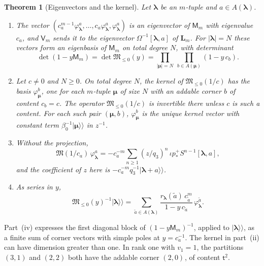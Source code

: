 \documentclass[11pt]{amsart}
\newtheorem{theorem}{Theorem}[section]
\theoremstyle{definition}
\theoremstyle{remark}
\newcommand{\Mt}{\mathsf t}                      %
\newcommand{\betaz}{\beta_0}                     %
\newcommand{\bl}{{\boldsymbol{\lambda}}}         %
\newcommand{\bmu}{{\boldsymbol{\mu}}}
\newcommand{\Add}[1]{A(#1)}                      %
\newcommand{\res}[2]{r_{#1}(#2)}                 %
\newcommand{\ceig}[1]{c_{#1}}                    %
\newcommand{\bx}[3]{(#1,#2)_{#3}}                %
\newcommand{\kket}[1]{\lvert #1\rangle\!\rangle} %
\newcommand{\pt}[2]{[#1,#2]}                     %
\newcommand{\pushp}{p^+_*}                       %
\newcommand{\Shift}{S}                           %
\newcommand{\Omap}{\Omega}                       %
\newcommand{\Hiso}{\iota}                        %
\newcommand{\LL}{\mathbf L}
\newcommand{\Lax}[1]{\LL_{#1}}                   %
\newcommand{\MM}{\mathsf M}
\newcommand{\Miura}[1]{\MM_{#1}}                 %
\newcommand{\VV}{\mathsf V}
\newcommand{\Vconj}[1]{\VV_{#1}}                 %
\newcommand{\Miuraop}{\mathfrak M}               %
\newcommand{\Miuraproj}{\Miuraop_{\leq0}}         %
\newcommand{\Meig}[2]{\varphi_{#1}^{#2}}         %
\begin{document}
\begin{theorem}[Eigenvectors and the kernel]\label{thm:kernel}
Let \(\bl\) be an \(m\)-tuple and \(a\in\Add{\bl}\).
\begin{enumerate}
\item[(i)] The vector \((\ceig{a}^{m-1}\Meig{\bl}{a},\dots,\ceig{a}\Meig{\bl}{a},\Meig{\bl}{a})\) is an eigenvector
of \(\Miura{m}\) with eigenvalue \(\ceig{a}\), and \(\Vconj{m}\) sends it to the eigenvector
\(\Omap^{-1}\pt{\bl}{a}\) of \(\Lax{m}\). For \(|\bl|=N\) these vectors form an eigenbasis of \(\Miura{m}\) on total
degree \(N\), with determinant
\[
 \det(1-y\Miura{m})=\det\Miuraproj(y)=\prod_{|\bmu|=N}\ \prod_{b\in\Add{\bmu}}(1-y\,\ceig{b}).
\]
\item[(ii)] Let \(c\neq0\) and \(N\geq0\). On total degree \(N\), the kernel of \(\Miuraproj(1/c)\) has the basis
\(\Meig{\bmu}{b}\), one for each \(m\)-tuple \(\bmu\) of size \(N\) with an addable corner \(b\) of content
\(\ceig{b}=c\). The operator \(\Miuraproj(1/c)\) is invertible there unless \(c\) is such a content.
For each such pair \((\bmu,b)\), \(\Meig{\bmu}{b}\) is the unique kernel vector
with constant term \(\betaz^{-1}\kket{\bmu}\) in \(z^{-1}\).
\item[(iii)] Without the projection,
\[
 \Miuraop(1/\ceig{a})\,\Meig{\bl}{a}
 =-\ceig{a}^{-m}\sum_{n\geq1}(z/q_3)^n\,\Hiso\pushp\Shift^{n-1}\pt{\bl}{a},
\]
and the coefficient of \(z\) here is \(-\ceig{a}^{-m}q_3^{-1}\kket{\bl+a}\).
\item[(iv)] As series in \(y\),
\[
 \Miuraproj(y)^{-1}\kket{\bl}
 =\sum_{\tilde a\in\Add{\bl}}\frac{\res{\bl}{\tilde a}\,\ceig{\tilde a}^m}{1-y\,\ceig{\tilde a}}\,
 \Meig{\bl}{\tilde a}.
\]
\end{enumerate}
\end{theorem}

Part~(iv) expresses the first diagonal block of
\((1-y\Miura{m})^{-1}\), applied to \(\kket{\bl}\), as a finite sum of
corner vectors with simple poles at \(y=\ceig{a}^{-1}\).
The kernel in part~(ii) can have dimension greater than one.
In rank one with \(v_1=1\), the partitions \((3,1)\) and \((2,2)\)
both have the addable corner \(\bx{2}{0}{}\), of content \(\Mt^2\).
\end{document}
